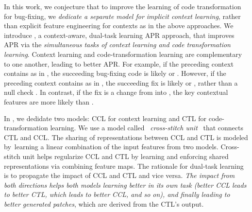 In this work, we conjecture that to improve the learning of code
transformation for bug-fixing, we {\em dedicate a separate model for
implicit context learning}, rather than explicit feature engineering
for contexts as in the above approaches.
%
We introduce {\tool}, a context-aware, dual-task learning APR
approach, that improves APR via the {\em simultaneous tasks of context
  learning and code transformation learning}.  Context learning and
code-transformation learning are complementary to one another, leading
to better APR. For example, if the preceding context contains
 as in , the
succeeding bug-fixing code is likely  \code{!=}
 or  \code{==} . However, if the
preceding context contains  as in  \code{=}
, the succeeding fix is likely  \code{!=}  or  \code{==} ,
rather than a null check  \code{!=} . In
contrast, if the fix is a change from  \code{==}
 into  \code{!=} , the key
contextual features are more likely  than
.

\indent In {\tool}, we dedidate two models: CCL for context learning and CTL
for code-transformation learning. We use a model called~{\em
  cross-stitch unit}~\cite{misra2016cross} that connects CTL and
CCL. The sharing of representations between CCL and CTL is modeled
by~learning a linear combination of the input features from two
models. Cross-stitch unit helps regularize CCL and CTL by learning and
enforcing shared representations via combining feature maps. The
rationale for dual-task learning is to propagate the impact of CCL and
CTL and vice versa. {\em The impact from both directions helps both
  models learning better in its own task (better CCL leads to better
  CTL, which leads to better CCL, and so on), and finally leading to
  better generated patches}, which are derived from the CTL's output.

